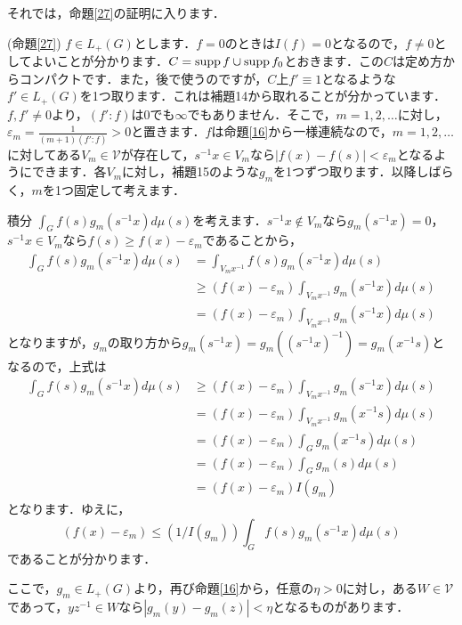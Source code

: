 それでは，命題\ref{27}の証明に入ります．
\begin{Proof}(命題\ref{27})
$f \in L_{+}(G)$とします．$f=0$のときは$I(f)=0$となるので，$f \neq 0$としてよいことが分かります．$C=\operatorname{supp} f \cup \operatorname{supp} f_{0}$とおきます．この$C$は定め方からコンパクトです．また，後で使うのですが，$C$上$f' \equiv 1$となるような$f' \in L_{
+}(G)$を1つ取ります．これは補題14から取れることが分かっています．$f, f' \neq 0$より，$\left( f' : f\right)$は0でも$\infty$でもありません．そこで，$m=1,2,\ldots$に対し，$\varepsilon_{m}=\frac{1}{(m+1)\left( f' : f \right)}>0$と置きます．$f$は命題\ref{16}から一様連続なので，$m=1,2,\ldots$に対してある$V_m \in \mathscr{V}$が存在して，$s^{-1}x \in V_m$なら$|f(x)-f(s)|<\varepsilon _{m}$となるようにできます．各$V_m$に対し，補題15のような$g_m$を1つずつ取ります．以降しばらく，$m$を1つ固定して考えます．

積分 $\int_{G}f(s)g_{m}(s^{-1}x)d\mu(s)$を考えます．$s^{-1}x \not\in V_m$なら$g_{m}(s^{-1}x)=0$，$s^{-1}x \in V_m$なら$f(s) \ge f(x) -\varepsilon_{m}$であることから，
\begin{align*}
\int_{G}f(s)g_{m}(s^{-1}x)d\mu(s) & =\int_{V_{m}x^{-1}}f(s)g_{m}(s^{-1}x)d\mu(s) \\
 & \ge (f(x)-\varepsilon_{m})\int_{V_{m}x^{-1}}g_{m}(s^{-1}x)d\mu(s) \\
 & =(f(x)-\varepsilon_{m})\int_{V_{m}x^{-1}}g_{m}(s^{-1}x)d\mu(s)
\end{align*}
となりますが，$g_{m}$の取り方から$g_{m}(s^{-1}x)=g_{m}\left( (s^{-1}x)^{-1} \right)=g_{m}(x^{-1}s)$となるので，上式は
\begin{align*}
\int_{G}f(s)g_{m}(s^{-1}x)d\mu(s) & \ge (f(x)-\varepsilon_{m})\int_{V_{m}x^{-1}}g_{m}(s^{-1}x)d\mu(s) \\
 & = (f(x)-\varepsilon_{m})\int_{V_{m}x^{-1}}g_{m}(x^{-1}s)d\mu(s) \\
 & = (f(x)-\varepsilon_{m})\int_{G}g_{m}(x^{-1}s)d\mu(s) \\
 & = (f(x)-\varepsilon_{m})\int_{G}g_{m}(s)d\mu(s) \\
 & =(f(x)-\varepsilon_{m}) I(g_{m})
\end{align*}
となります．ゆえに，
\begin{equation}
(f(x)-\varepsilon_{m}) \le \left( 1/I(g_{m}) \right)\int_{G}f(s)g_{m}(s^{-1}x)d\mu(s)
\label{i2}
\end{equation}
であることが分かります．

ここで，$g_{m} \in L_{+}(G)$より，再び命題\ref{16}から，任意の$\eta >0$に対し，ある$W \in \mathscr{V}$であって，$yz^{-1} \in W$なら$|g_{m}(y)-g_{m}(z)|<\eta$となるものがあります．


\end{Proof}
